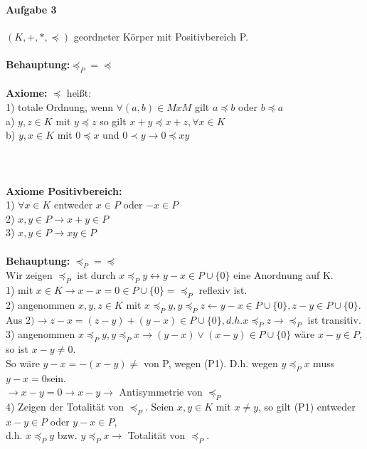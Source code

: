 \documentclass[10pt,a4paper]{scrartcl}
\begin{document}
\paragraph*{Aufgabe 3}
\begin{tabbing}
$(K,+,*,\preceq)$ geordneter Körper mit Positivbereich P.\\\\
\textbf{Behauptung:}$\preceq_{P}=\preceq$\\\\

\textbf{Axiome:} $\preceq$ heißt:\\
 1) totale Ordnung, wenn $\forall (a,b)\in MxM$ gilt $a\preceq b$ oder $b\preceq a$\\
  a) $y,z\in K$ mit $y\preceq z$ so gilt $x + y\preceq x+z,\forall x\in K$\\
  b) $y,x\in K$ mit $0\preceq x$ und  $0\prec y\rightarrow 0\preceq xy$\\\\\\\\

\textbf{Axiome Positivbereich:}\\
 1) $\forall x\in K$ entweder $x\in P$ oder $-x\in P$\\
 2) $x,y\in P\rightarrow x+y\in P$\\
 3) $x,y\in P\rightarrow xy\in P$\\\\

\textbf{Behauptung:} $\preceq_{P} =\preceq$\\
Wir zeigen $\preceq_{P}$ ist durch $x\preceq_{P} y\leftrightarrow y-x\in P\cup \{0\}$ eine Anordnung auf K.\\
 1) mit $x\in K\rightarrow x-x=0\in P\cup \{0\}=\preceq_{P}$ reflexiv ist.\\
 
 2) angenommen  $x,y,z\in K$ mit $x\preceq_{P} y, y\preceq_{P} z\leftarrow y-x\in P\cup \{0\}, z-y\in P\cup\{0\}$.\\
 	Aus $2)\rightarrow z-x=(z-y)+(y-x)\in P\cup \{0\}, d.h. x\preceq_{P} z\rightarrow \preceq_{P}$ ist transitiv.\\
 
 3) angenommen $x\preceq_{P} y, y\preceq_{P} x\rightarrow (y-x)\vee (x-y)\in P\cup \{0\}$ wäre $x-y\in P$, so ist $x-y\neq 0$.\\
 So wäre $y-x=-(x-y)\neq$ von P, wegen (P1). D.h. wegen $y\preceq_{P} x$ muss $y-x=0$sein.\\
 $\rightarrow x-y=0\rightarrow x-y\rightarrow$ Antisymmetrie von $\preceq_{P}$\\
 
 4) Zeigen der Totalität von $\preceq_{P}$. Seien $x,y\in K$ mit $x\neq y$, so gilt (P1) entweder $x-y\in P$ oder $y-x\in P$,\\ d.h. $x\preceq_{P} y$ bzw. $y\preceq_{P} x\rightarrow$ Totalität von $\preceq_{P}$.\\
\end{tabbing}
\end{document}

